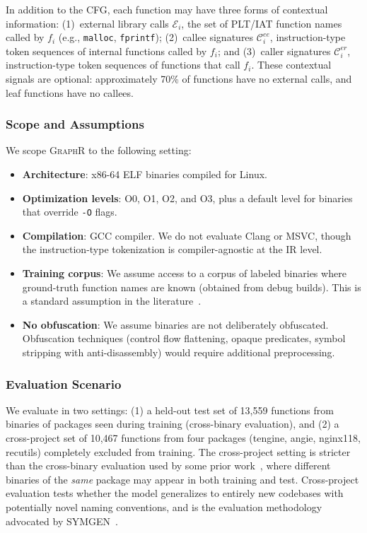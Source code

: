 \documentclass[sigconf,nonacm]{acmart}
\newcommand{\sysname}{\textsc{GraphR}}
\begin{document}
In addition to the CFG, each function may have three forms of contextual information: (1)~external library calls $\mathcal{E}_i$, the set of PLT/IAT function names called by $f_i$ (e.g., \texttt{malloc}, \texttt{fprintf}); (2)~callee signatures $\mathcal{C}_i^{ee}$, instruction-type token sequences of internal functions called by $f_i$; and (3)~caller signatures $\mathcal{C}_i^{er}$, instruction-type token sequences of functions that call $f_i$. These contextual signals are optional: approximately 70\% of functions have no external calls, and leaf functions have no callees.

\subsubsection{Scope and Assumptions}

We scope \sysname{} to the following setting:

\begin{itemize}
    \item \textbf{Architecture}: x86-64 ELF binaries compiled for Linux.
    \item \textbf{Optimization levels}: O0, O1, O2, and O3, plus a default level for binaries that override \texttt{-O} flags.
    \item \textbf{Compilation}: GCC compiler. We do not evaluate Clang or MSVC, though the instruction-type tokenization is compiler-agnostic at the IR level.
    \item \textbf{Training corpus}: We assume access to a corpus of labeled binaries where ground-truth function names are known (obtained from debug builds). This is a standard assumption in the literature~\cite{debin,nero,symlm,blens,symgen}.
    \item \textbf{No obfuscation}: We assume binaries are not deliberately obfuscated. Obfuscation techniques (control flow flattening, opaque predicates, symbol stripping with anti-disassembly) would require additional preprocessing.
\end{itemize}

\subsubsection{Evaluation Scenario}

We evaluate in two settings: (1) a held-out test set of 13{,}559 functions from binaries of packages seen during training (cross-binary evaluation), and (2) a cross-project set of 10{,}467 functions from four packages (tengine, angie, nginx118, recutils) completely excluded from training. The cross-project setting is stricter than the cross-binary evaluation used by some prior work~\cite{nero,symlm}, where different binaries of the \emph{same} package may appear in both training and test. Cross-project evaluation tests whether the model generalizes to entirely new codebases with potentially novel naming conventions, and is the evaluation methodology advocated by SYMGEN~\cite{symgen}.
\end{document}
